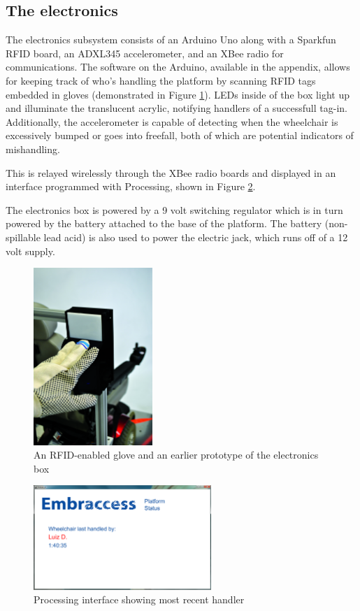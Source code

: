 \subsection{The electronics}

The electronics subsystem consists of an Arduino Uno along with a Sparkfun RFID board, an ADXL345 accelerometer, and an XBee radio for communications. The software on the Arduino, available in the appendix, allows for keeping track of who's handling the platform by scanning RFID tags embedded in gloves (demonstrated in Figure \ref{fig:glove}). LEDs inside of the box light up and illuminate the translucent acrylic, notifying handlers of a successfull tag-in. Additionally, the accelerometer is capable of detecting when the wheelchair is excessively bumped or goes into freefall, both of which are potential indicators of mishandling.

This is relayed wirelessly through the XBee radio boards and displayed in an interface programmed with Processing, shown in Figure \ref{fig:processing}.

The electronics box is powered by a 9 volt switching regulator which is in turn powered by the battery attached to the base of the platform. The battery (non-spillable lead acid) is also used to power the electric jack, which runs off of a 12 volt supply.

\begin{figure}
\centering
 \includegraphics[width=0.4\textwidth]{images/glove}
\caption{An RFID-enabled glove and an earlier prototype of the electronics box}
\label{fig:glove}
\end{figure}

\begin{figure}
\centering
 \includegraphics[width=0.6\textwidth]{images/processing_use}
\caption{Processing interface showing most recent handler}
\label{fig:processing}
\end{figure}

